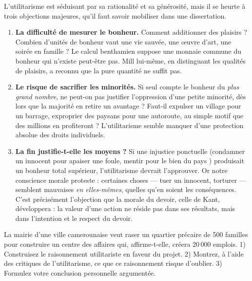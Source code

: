 \documentclass[11pt]{article}
\begin{document}
L'utilitarisme est séduisant par sa rationalité et sa générosité, mais il se heurte à trois objections majeures, qu'il faut savoir mobiliser dans une dissertation.

\begin{enumerate}
\item \textbf{La difficulté de mesurer le bonheur.} Comment additionner des plaisirs ? Combien d'unités de bonheur vaut une vie sauvée, une œuvre d'art, une soirée en famille ? Le calcul benthamien suppose une monnaie commune du bonheur qui n'existe peut-être pas. Mill lui-même, en distinguant les qualités de plaisirs, a reconnu que la pure quantité ne suffit pas.
\item \textbf{Le risque de sacrifier les minorités.} Si seul compte le bonheur du \emph{plus grand nombre}, ne peut-on pas justifier l'oppression d'une petite minorité, dès lors que la majorité en retire un avantage ? Faut-il expulser un village pour un barrage, exproprier des paysans pour une autoroute, au simple motif que des millions en profiteront ? L'utilitarisme semble manquer d'une protection absolue des droits individuels.
\item \textbf{La fin justifie-t-elle les moyens ?} Si une injustice ponctuelle (condamner un innocent pour apaiser une foule, mentir \og pour le bien du pays \fg{}) produisait un bonheur total supérieur, l'utilitarisme devrait l'approuver. Or notre conscience morale proteste : certaines choses — tuer un innocent, torturer — semblent mauvaises \emph{en elles-mêmes}, quelles qu'en soient les conséquences. C'est précisément l'objection que la morale du devoir, celle de Kant, développera : la valeur d'une action ne réside pas dans ses résultats, mais dans l'intention et le respect du devoir.
\end{enumerate}

\begin{exercice}
La mairie d'une ville camerounaise veut raser un quartier précaire de 500 familles pour construire un centre des affaires qui, affirme-t-elle, créera 20\,000 emplois. 1) Construisez le raisonnement utilitariste en faveur du projet. 2) Montrez, à l'aide des critiques de l'utilitarisme, ce que ce raisonnement risque d'oublier. 3) Formulez votre conclusion personnelle argumentée.
\end{exercice}
\end{document}
